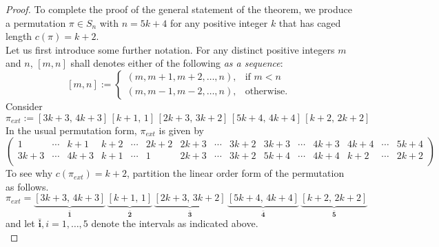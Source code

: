 \documentclass[11pt, a4paper]{article}
\theoremstyle{compact}
\begin{document}
\begin{proof}
    To complete the proof of the general statement of the theorem, we produce a permutation $\pi \in S_n$ with $n = 5k + 4$ for any positive integer $k$ that has caged length $c(\pi) = k +2$.\\
    
    Let us first introduce some further notation. For any distinct positive integers $m$ and $n$, $[m,n]$ shall denotes either of the following \emph{as a sequence}:
    \[
        [m,n] := 
        \begin{cases}
            (m,m+1,m+2,\dots,n), & \text{if $m < n$} \\
            (m, m-1, m-2, \dots, n), & \text{otherwise.}   
        \end{cases}  
    \]
Consider
    \[
    \pi_{ext}  := [3k+3, \, 4k+3]\,[k+1, \,1]\,[2k+3, \,3k+2]\,[5k+4, \,4k+4]\,[k+2,\,2k+2] 
    \]
    In the usual permutation form, $\pi_{ext}$ is given by 
    \[
 \begin{pmatrix}
    1 & \cdots & k+1 & k+2 & \cdots & 2k +2 & 2k +3 & \cdots & 3k + 2 & 3k + 3 & \cdots & 4k + 3 & 4k + 4 & \cdots & 5k + 4 \\
    3k + 3 & \cdots & 4k + 3 & k + 1 & \cdots & 1 & 2k + 3 & \cdots & 3k + 2 & 5k + 4 & \cdots & 4k + 4 & k + 2 & \cdots & 2k + 2 \\
  \end{pmatrix}
    \]
    To see why $c(\pi_{ext})  = k+2 $, partition the linear order form of the permutation as follows. 
    \[
    \pi_{ext}  = \underbrace{[3k+3, \, 4k+3]}_\text{$\bar{\mathbf{1}}$}\,\underbrace{[k+1, \,1]}_\text{$\bar{\mathbf{2}}$}\,\underbrace{[2k+3, \,3k+2]}_\text{$\bar{\mathbf{3}}$}\,\underbrace{[5k+4, \,4k+4]}_\text{$\bar{\mathbf{4}}$}\,\underbrace{[k+2,\,2k+2]}_\text{$\bar{\mathbf{5}}$}
    \] and let $\bar{\mathbf{i}}, i=1,\ldots,5$ denote the intervals as indicated above.\\
    

\end{proof}
\end{document}
